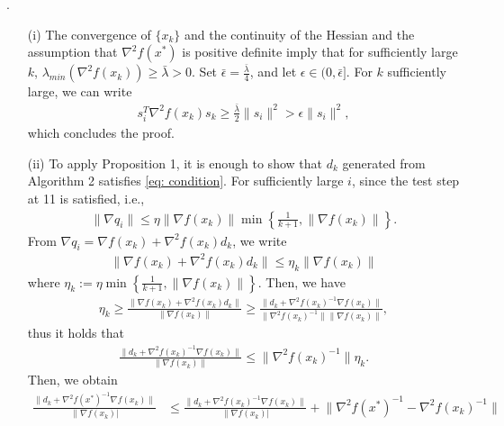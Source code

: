 \documentclass{ExerciseSheet}
\begin{document}
\begin{solution}.

    \begin{itemize}
        \item[(i)] The convergence of $\{x_k\}$ and the continuity of the Hessian and the assumption that $\nabla^2 f(x^*)$ is positive definite imply that for sufficiently large $k$, $\lambda_{min}(\nabla^2 f(x_k))\geq \bar{\lambda}>0$. Set $\bar{\epsilon}=\frac{\bar{\lambda}}{4}$, and let $\epsilon \in (0,\bar{\epsilon}]$. For $k$ sufficiently large, we can write 
        \begin{align*}
            s_i^T\nabla^2 f(x_k)s_k \geq \frac{\bar{\lambda}}{2}\lVert s_i\rVert^2 > \epsilon\lVert s_i\rVert^2,
        \end{align*}
        which concludes the proof.
        \item[(ii)]
        To apply Proposition 1, it is enough to show that $d_k$ generated from Algorithm 2 satisfies \eqref{eq: condition}. For sufficiently large $i$, since the test step at 11 is satisfied, i.e., 
        \begin{align*}
            \lVert \nabla q_i \rVert \leq \eta \lVert \nabla f(x_k)\rVert \min \left\{\frac{1}{k+1}, \lVert \nabla f(x_k)\rVert\right\}.
        \end{align*}
        From $\nabla q_i = \nabla f(x_k)+\nabla^2 f(x_k)d_k $, we write
        \begin{align}
            \lVert\nabla f(x_k)+\nabla^2 f(x_k)d_k\lVert \leq \eta_k \lVert\nabla f(x_k)\lVert 
        \end{align}
        where $\eta_k:=\eta \min \left\{\frac{1}{k+1}, \lVert \nabla f(x_k)\rVert\right\}$. Then, we have
        \begin{align*}
            \eta_k \geq \frac{\lVert\nabla f(x_k)+\nabla^2 f(x_k)d_k\rVert}{\lVert\nabla f(x_k)\lVert } \geq \frac{\lVert d_k + \nabla^2 f(x_k)^{-1} \nabla f(x_k)\rVert}{\lVert\nabla^2 f(x_k)^{-1}\lVert \lVert\nabla f(x_k)\lVert },
        \end{align*}
        thus it holds that
        \begin{align*}
            \frac{\lVert d_k + \nabla^2 f(x_k)^{-1} \nabla f(x_k)\rVert}{ \lVert\nabla f(x_k)\lVert } \leq \lVert\nabla^2 f(x_k)^{-1}\lVert \eta_k.
        \end{align*}
        Then, we obtain
        \begin{align*}
            \frac{\lVert d_k+\nabla^2 f(x^*)^{-1}\nabla f(x_k)\rVert}{\lVert \nabla f(x_k)\rvert} &\leq \frac{\lVert d_k+\nabla^2 f(x_k)^{-1}\nabla f(x_k)\rVert}{\lVert \nabla f(x_k)\rvert}+\lVert \nabla^2 f(x^*)^{-1}-\nabla^2 f(x_k)^{-1}\rVert\\

\end{align*}
\end{itemize}
\end{solution}
\end{document}
